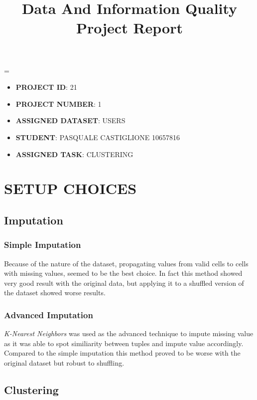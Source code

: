 \documentclass{article}
\title{
	\vspace{4cm}
	\textbf{Data And Information Quality Project Report}\\
}
\author{}
\date{}
\newcommand{\justified}
{
	\tolerance=1
	\emergencystretch=\maxdimen
	\hyphenpenalty=10000
	\hbadness=10000
}
\begin{document}
\maketitle
\vfill
\justified
\begin{itemize}
	\item\textbf{PROJECT ID}: 21
	\item\textbf{PROJECT NUMBER}: 1
	\item\textbf{ASSIGNED DATASET}: USERS
	\item\textbf{STUDENT}: PASQUALE CASTIGLIONE 10657816
	\item\textbf{ASSIGNED TASK}: CLUSTERING
\end{itemize}

\newpage

\tableofcontents

\newpage



\section{SETUP CHOICES}

\subsection{Imputation}

\subsubsection{Simple Imputation}
Because of the nature of the dataset, propagating values from valid cells to cells with missing values, seemed to be the best choice. In fact this method showed very good result with the original data, but applying it to a shuffled version of the dataset showed worse results.  

\subsubsection{Advanced Imputation}
\emph{K-Nearest Neighbors} was used as the advanced technique to impute missing value as it was able to spot similiarity between tuples and impute value accordingly. Compared to the simple imputation this method proved to be worse with the original dataset but robust to shuffling.

\subsection{Clustering}
\end{document}
